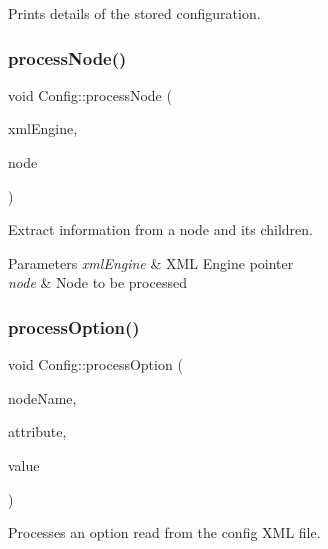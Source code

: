 Prints details of the stored configuration. 

\mbox{\label{class_config_a46d81f90a7b6218385e8bfd0a283f6ce}} 
\subsubsection{\texorpdfstring{process\+Node()}{processNode()}}
{\footnotesize\ttfamily void Config\+::process\+Node (\begin{DoxyParamCaption}\item[{T\+X\+M\+L\+Engine $\ast$}]{xml\+Engine,  }\item[{X\+M\+L\+Node\+Pointer\+\_\+t}]{node }\end{DoxyParamCaption})\hspace{0.3cm}{\ttfamily [private]}}



Extract information from a node and its children. 


\begin{DoxyParams}{Parameters}
{\em xml\+Engine} & X\+ML Engine pointer \\
\hline
{\em node} & Node to be processed \\
\hline
\end{DoxyParams}
\mbox{\label{class_config_a5f1048494003d7deb4edd9064fc6e9c5}} 
\subsubsection{\texorpdfstring{process\+Option()}{processOption()}}
{\footnotesize\ttfamily void Config\+::process\+Option (\begin{DoxyParamCaption}\item[{const std\+::string}]{node\+Name,  }\item[{const std\+::string}]{attribute,  }\item[{const std\+::string}]{value }\end{DoxyParamCaption})\hspace{0.3cm}{\ttfamily [private]}}



Processes an option read from the config X\+ML file. 


